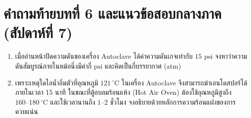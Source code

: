 \section*{คำถามท้ายบทที่ 6 และแนวข้อสอบกลางภาค (สัปดาห์ที่ 7)}
\begin{enumerate}
    \item เมื่ออ่านหน้าปัดความดันของเครื่อง Autoclave ได้ค่าความดันเกจเท่ากับ $15\text{ psi}$ จงหาว่าความดันสัมบูรณ์ภายในหม้อนึ่งมีค่ากี่ $\text{psi}$ และคิดเป็นกี่บรรยากาศ ($\text{atm}$)
    \item เพราะเหตุใดไอน้ำอิ่มตัวที่อุณหภูมิ $121\,^\circ\text{C}$ ในเครื่อง Autoclave จึงสามารถฆ่าเอนโดสปอร์ได้ภายในเวลา 15 นาที ในขณะที่ตู้อบลมร้อนแห้ง (Hot Air Oven) ต้องใช้อุณหภูมิสูงถึง $160\text{--}180\,^\circ\text{C}$ และใช้เวลานานถึง $1\text{--}2$ ชั่วโมง จงอธิบายด้วยหลักการความร้อนแฝงของการควบแน่น
\end{enumerate}
